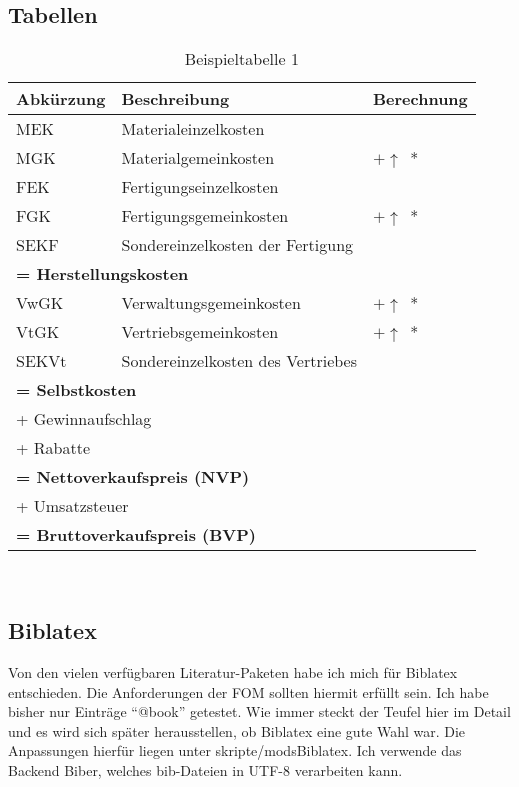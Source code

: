 \subsection{Tabellen}
\begin{table}[H]
\centering
\begin{tabularx}{\textwidth}[ht]{|l|X|l|}
  \hline
  \textbf{Abkürzung} & \textbf{Beschreibung} & \textbf{Berechnung}\\
  \hline\hline
    MEK & Materialeinzelkosten & \\
  	MGK & Materialgemeinkosten & $+ \uparrow$~*\\
    FEK & Fertigungseinzelkosten & \\
  	FGK & Fertigungsgemeinkosten & $+ \uparrow$~*\\
	SEKF & Sondereinzelkosten der Fertigung & \\
	\hline\hline
	\multicolumn{3}{|l|}{\textbf{= Herstellungskosten}} \\
	\hline\hline
  	VwGK & Verwaltungsgemeinkosten & $+ \uparrow$~*\\
  	VtGK & Vertriebsgemeinkosten & $+ \uparrow$~*\\
  	SEKVt & Sondereinzelkosten des Vertriebes & \\
	\hline\hline
	\multicolumn{3}{|l|}{\textbf{= Selbstkosten}} \\
	\hline\hline
	\multicolumn{3}{|l|}{+ Gewinnaufschlag} \\
	\multicolumn{3}{|l|}{+ Rabatte} \\
	\hline\hline
	\multicolumn{3}{|l|}{\textbf{= Nettoverkaufspreis (NVP)}} \\
	\hline
	\multicolumn{3}{|l|}{+ Umsatzsteuer} \\
	\hline\hline
	\multicolumn{3}{|l|}{\textbf{= Bruttoverkaufspreis (BVP)}} \\
	\hline
\end{tabularx} \\
		\caption{Beispieltabelle 1}
		\label{tbl:beispieltabelle2}
\end{table}


\subsection{Biblatex}
Von den vielen verfügbaren Literatur-Paketen habe ich mich für Biblatex entschieden. Die Anforderungen der FOM sollten hiermit erfüllt sein. Ich habe bisher nur Einträge \enquote{@book} getestet. Wie immer steckt der Teufel hier im Detail und es wird sich später herausstellen, ob Biblatex eine gute Wahl war. Die Anpassungen hierfür liegen unter skripte/modsBiblatex. Ich verwende das Backend Biber, welches bib-Dateien in UTF-8 verarbeiten kann.

